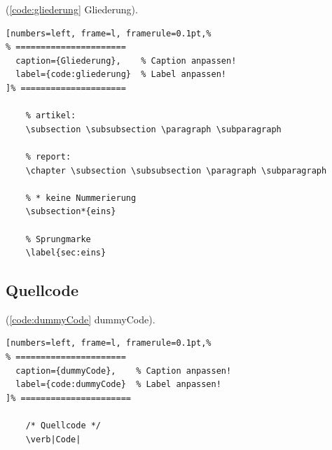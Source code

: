 (\autoref{code:gliederung} Gliederung).
\lstset{language=[LaTeX]TeX} %
\begin{lstlisting}[numbers=left, frame=l, framerule=0.1pt,%
% ======================
  caption={Gliederung},    % Caption anpassen!
  label={code:gliederung}  % Label anpassen!
]% =====================

	% artikel:
	\subsection \subsubsection \paragraph \subparagraph

	% report:
	\chapter \subsection \subsubsection \paragraph \subparagraph

	% * keine Nummerierung
	\subsection*{eins}

	% Sprungmarke
	\label{sec:eins}
\end{lstlisting}

\newpage %

\subsection{Quellcode}

(\autoref{code:dummyCode} dummyCode).  %
\lstset{language=[LaTeX]TeX} %
\begin{lstlisting}[numbers=left, frame=l, framerule=0.1pt,%
% ======================
  caption={dummyCode},    % Caption anpassen!
  label={code:dummyCode}  % Label anpassen!
]% ======================

	/* Quellcode */
	\verb|Code|
\end{lstlisting}

